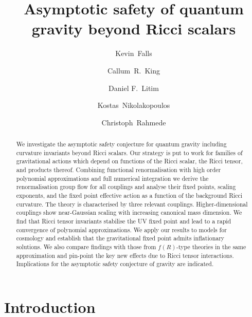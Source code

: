\documentclass[notitlepage,eqsecnum,bm,amsmath,preprintnumbers,superscriptaddress,nofootinbib,aps,11pt]{revtex4-1}
\begin{document}
\title{Asymptotic safety of quantum gravity beyond Ricci scalars} 
\author{Kevin~Falls}
\author{Callum~R.~King}
\author{Daniel F.~Litim}
\author{Kostas~Nikolakopoulos}
\author{Christoph~Rahmede}




\begin{abstract}
We investigate the asymptotic safety conjecture for quantum gravity 
including
curvature invariants beyond Ricci scalars.
Our strategy is put to work for families of gravitational actions which depend on functions of the Ricci scalar, the Ricci tensor, and   products thereof.  
Combining functional renormalisation with high order polynomial approximations and full numerical integration 
we derive the renormalisation group flow for all couplings and analyse their fixed points, scaling exponents, and the fixed point effective action as a function of the background Ricci curvature.  The theory is characterised by three relevant couplings. Higher-dimensional couplings 
show near-Gaussian scaling with increasing canonical mass dimension. We find that Ricci tensor invariants  stabilise the UV fixed point and lead to a rapid convergence of 
polynomial approximations.
We apply our results to models for cosmology and establish that the gravitational fixed point admits inflationary solutions. We also compare findings with those from $f(R)$-type theories in the same approximation and pin-point the key new effects due to Ricci tensor interactions.  
Implications for the asymptotic safety conjecture of gravity are indicated.
\end{abstract}
\maketitle


\begin{spacing}{.94}
\tableofcontents
\end{spacing}


\section{\bf Introduction}
\label{sec:IntroductionRM}
\end{document}
